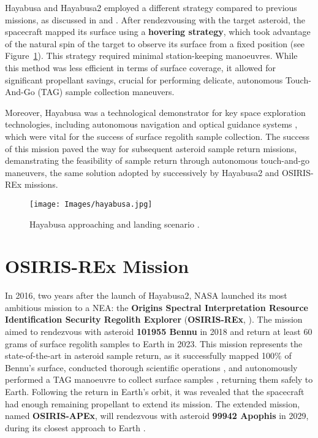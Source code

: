 \documentclass{Configuration_gigi/PoliMi3i_thesis}
\begin{document}
Hayabusa and Hayabusa2 employed a different strategy compared to previous missions, as discussed in \cite{hayabusaGNC} and \cite{hayabusa2MA}. After rendezvousing with the target asteroid, the spacecraft mapped its surface using a \textbf{hovering strategy}, which took advantage of the natural spin of the target to observe its surface from a fixed position (see Figure~\ref{fig:hayabusa}). This strategy required minimal station-keeping manoeuvres. While this method was less efficient in terms of surface coverage, it allowed for significant propellant savings, crucial for performing delicate, autonomous Touch-And-Go (TAG) sample collection maneuvers. 

Moreover, Hayabusa was a technological demonstrator for key space exploration technologies, including autonomous navigation and optical guidance systems \cite{hayabusaGNC}, which were vital for the success of surface regolith sample collection. The success of this mission paved the way for subsequent asteroid sample return missions, demanstrating the feasibility of sample return through autonomous touch-and-go maneuvers, the same solution adopted by successively by Hayabusa2 and  OSIRIS-REx missions.

\begin{figure}[H]
    \centering
    \texttt{[image: Images/hayabusa.jpg]}
    \caption[Hayabusa approach and landing.]{Hayabusa approaching and landing scenario \cite{hayabusaGNC}.}
    \label{fig:hayabusa}
\end{figure}


\section{OSIRIS-REx Mission}\label{Sec:OSIRIS-REx Mission}

In 2016, two years after the launch of Hayabusa2, NASA launched its most ambitious mission to a NEA: the \textbf{Origins Spectral Interpretation Resource Identification Security Regolith Explorer} (\textbf{OSIRIS-REx}, \cite{osirisrex}). The mission aimed to rendezvous with asteroid \textbf{101955 Bennu} in 2018 and return at least 60 grams of surface regolith samples to Earth in 2023. This mission represents the state-of-the-art in asteroid sample return, as it successfully mapped 100\% of Bennu's surface, conducted thorough scientific operations \cite{osirisrexDTM}, and autonomously performed a TAG manoeuvre to collect surface samples \cite{osirisrexTAG}, returning them safely to Earth. Following the return in Earth's orbit, it was revealed that the spacecraft had enough remaining propellant to extend its mission. The extended mission, named \textbf{OSIRIS-APEx}, will rendezvous with asteroid \textbf{99942 Apophis} in 2029, during its closest approach to Earth \cite{osirisapex}.
\end{document}
